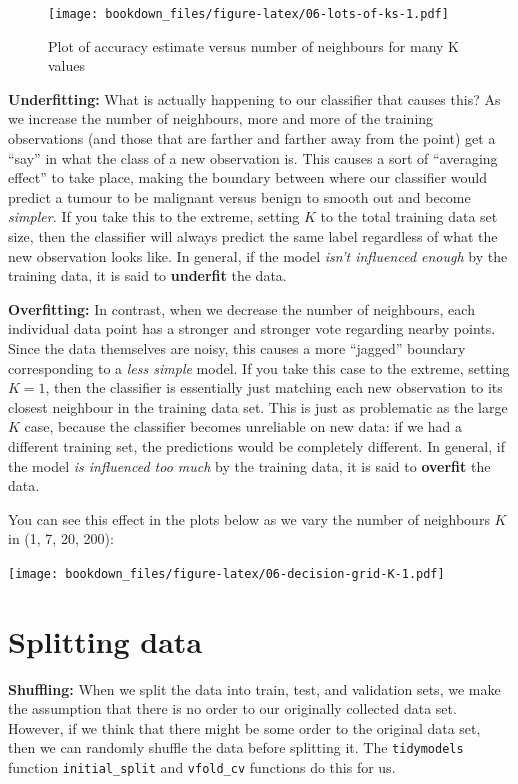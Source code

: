 \documentclass[
]{krantz}
\begin{document}
\begin{figure}
\centering
\texttt{[image: bookdown\_files/figure-latex/06-lots-of-ks-1.pdf]}
\caption{\label{fig:06-lots-of-ks}Plot of accuracy estimate versus number of neighbours for many K values}
\end{figure}

\textbf{Underfitting:} What is actually happening to our classifier that causes
this? As we increase the number of neighbours, more and more of the training
observations (and those that are farther and farther away from the point) get a
``say'' in what the class of a new observation is. This causes a sort of
``averaging effect'' to take place, making the boundary between where our
classifier would predict a tumour to be malignant versus benign to smooth out
and become \emph{simpler.} If you take this to the extreme, setting \(K\) to the total
training data set size, then the classifier will always predict the same label
regardless of what the new observation looks like. In general, if the model
\emph{isn't influenced enough} by the training data, it is said to \textbf{underfit} the
data.

\textbf{Overfitting:} In contrast, when we decrease the number of neighbours, each
individual data point has a stronger and stronger vote regarding nearby points.
Since the data themselves are noisy, this causes a more ``jagged'' boundary
corresponding to a \emph{less simple} model. If you take this case to the extreme,
setting \(K = 1\), then the classifier is essentially just matching each new
observation to its closest neighbour in the training data set. This is just as
problematic as the large \(K\) case, because the classifier becomes unreliable on
new data: if we had a different training set, the predictions would be
completely different. In general, if the model \emph{is influenced too much} by the
training data, it is said to \textbf{overfit} the data.

You can see this effect in the plots below as we vary the number of neighbours \(K\) in (1, 7, 20, 200):

\texttt{[image: bookdown\_files/figure-latex/06-decision-grid-K-1.pdf]}

\hypertarget{splitting-data}{%
\section{Splitting data}\label{splitting-data}}

\textbf{Shuffling:} When we split the data into train, test, and validation sets, we
make the assumption that there is no order to our originally collected data
set. However, if we think that there might be some order to the original data
set, then we can randomly shuffle the data before splitting it. The \texttt{tidymodels}
function \texttt{initial\_split} and \texttt{vfold\_cv} functions do this for us.
\end{document}
